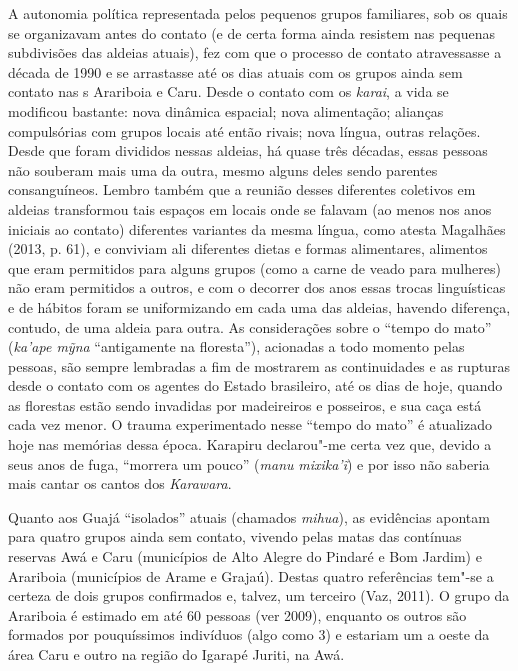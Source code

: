 A autonomia política representada pelos pequenos grupos familiares, sob
os quais se organizavam antes do contato (e de certa forma ainda
resistem nas pequenas subdivisões das aldeias atuais), fez com que o
processo de contato atravessasse a década de 1990 e se arrastasse até os
dias atuais com os grupos ainda sem contato nas s Arariboia e Caru.
Desde o contato com os \emph{karai}, a vida se modificou bastante: nova
dinâmica espacial; nova alimentação; alianças compulsórias com grupos
locais até então rivais; nova língua, outras relações. Desde que foram
divididos nessas aldeias, há quase três décadas, essas pessoas não
souberam mais uma da outra, mesmo alguns deles sendo parentes
consanguíneos. Lembro também que a reunião desses diferentes coletivos
em aldeias transformou tais espaços em locais onde se falavam (ao menos
nos anos iniciais ao contato) diferentes variantes da mesma língua, como
atesta Magalhães (2013, p. 61), e conviviam ali diferentes dietas e
formas alimentares, alimentos que eram permitidos para alguns grupos
(como a carne de veado para mulheres) não eram permitidos a outros, e
com o decorrer dos anos essas trocas linguísticas e de hábitos foram se
uniformizando em cada uma das aldeias, havendo diferença, contudo, de
uma aldeia para outra. As considerações sobre o ``tempo do mato''
(\emph{ka'ape mỹna} ``antigamente na floresta''), acionadas a todo
momento pelas pessoas, são sempre lembradas a fim de mostrarem as
continuidades e as rupturas desde o contato com os agentes do Estado
brasileiro, até os dias de hoje, quando as florestas estão sendo
invadidas por madeireiros e posseiros, e sua caça está cada vez menor. O
trauma experimentado nesse ``tempo do mato'' é atualizado hoje nas
memórias dessa época. Karapiru declarou"-me certa vez que, devido a seus
anos de fuga, ``morrera um pouco'' (\emph{manu} \emph{mixika'ĩ}) e por
isso não saberia mais cantar os cantos dos \emph{Karawara}.

Quanto aos Guajá ``isolados'' atuais (chamados \emph{mihua}), as
evidências apontam para quatro grupos ainda sem contato, vivendo pelas
matas das contínuas reservas Awá e Caru (municípios de Alto Alegre do
Pindaré e Bom Jardim) e Arariboia (municípios de Arame e Grajaú). Destas
quatro referências tem"-se a certeza de dois grupos confirmados e,
talvez, um terceiro (Vaz, 2011). O grupo da  Arariboia é estimado em
até 60 pessoas (ver  2009), enquanto os outros são formados por
pouquíssimos indivíduos (algo como 3) e estariam um a oeste da área Caru
e outro na região do Igarapé Juriti, na  Awá.

